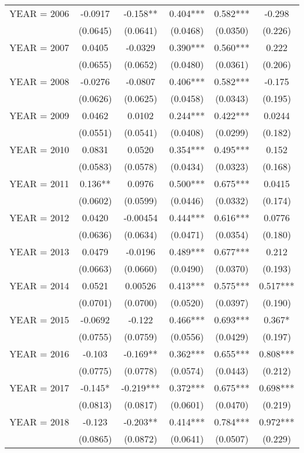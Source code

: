\begin{tabular}{lccccc}
YEAR = 2006 & -0.0917 & -0.158** & 0.404*** & 0.582*** & -0.298 \\
 & (0.0645) & (0.0641) & (0.0468) & (0.0350) & (0.226) \\
YEAR = 2007 & 0.0405 & -0.0329 & 0.390*** & 0.560*** & 0.222 \\
 & (0.0655) & (0.0652) & (0.0480) & (0.0361) & (0.206) \\
YEAR = 2008 & -0.0276 & -0.0807 & 0.406*** & 0.582*** & -0.175 \\
 & (0.0626) & (0.0625) & (0.0458) & (0.0343) & (0.195) \\
YEAR = 2009 & 0.0462 & 0.0102 & 0.244*** & 0.422*** & 0.0244 \\
 & (0.0551) & (0.0541) & (0.0408) & (0.0299) & (0.182) \\
YEAR = 2010 & 0.0831 & 0.0520 & 0.354*** & 0.495*** & 0.152 \\
 & (0.0583) & (0.0578) & (0.0434) & (0.0323) & (0.168) \\
YEAR = 2011 & 0.136** & 0.0976 & 0.500*** & 0.675*** & 0.0415 \\
 & (0.0602) & (0.0599) & (0.0446) & (0.0332) & (0.174) \\
YEAR = 2012 & 0.0420 & -0.00454 & 0.444*** & 0.616*** & 0.0776 \\
 & (0.0636) & (0.0634) & (0.0471) & (0.0354) & (0.180) \\
YEAR = 2013 & 0.0479 & -0.0196 & 0.489*** & 0.677*** & 0.212 \\
 & (0.0663) & (0.0660) & (0.0490) & (0.0370) & (0.193) \\
YEAR = 2014 & 0.0521 & 0.00526 & 0.413*** & 0.575*** & 0.517*** \\
 & (0.0701) & (0.0700) & (0.0520) & (0.0397) & (0.190) \\
YEAR = 2015 & -0.0692 & -0.122 & 0.466*** & 0.693*** & 0.367* \\
 & (0.0755) & (0.0759) & (0.0556) & (0.0429) & (0.197) \\
YEAR = 2016 & -0.103 & -0.169** & 0.362*** & 0.655*** & 0.808*** \\
 & (0.0775) & (0.0778) & (0.0574) & (0.0443) & (0.212) \\
YEAR = 2017 & -0.145* & -0.219*** & 0.372*** & 0.675*** & 0.698*** \\
 & (0.0813) & (0.0817) & (0.0601) & (0.0470) & (0.219) \\
YEAR = 2018 & -0.123 & -0.203** & 0.414*** & 0.784*** & 0.972*** \\
 & (0.0865) & (0.0872) & (0.0641) & (0.0507) & (0.229) \\

\end{tabular}
